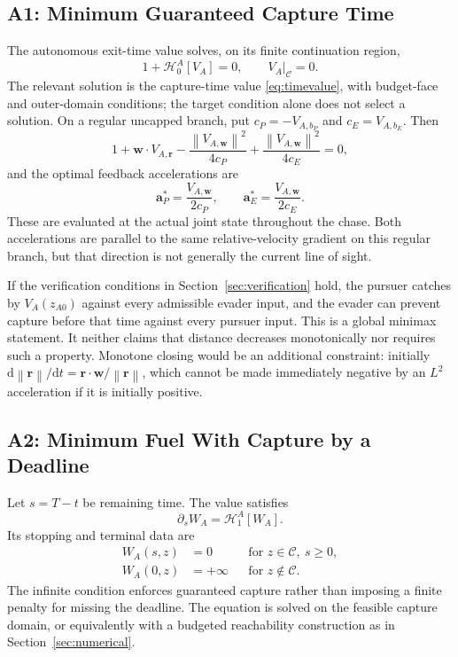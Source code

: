\documentclass[journal,a4paper]{IEEEtran}
\newcommand{\C}{\mathcal C}
\newcommand{\HH}{\mathcal H}
\newcommand{\norm}[1]{\left\|#1\right\|}
\newcommand{\dd}{\mathrm d}
\begin{document}
\subsection{A1: Minimum Guaranteed Capture Time}
The autonomous exit-time value solves, on its finite continuation region,
\begin{equation}
 \boxed{1+\HH^A_0[V_A]=0,\qquad V_A|_{\C}=0.}
 \label{eq:A1}
\end{equation}
The relevant solution is the capture-time value \eqref{eq:timevalue}, with budget-face and outer-domain conditions; the target condition alone does not select a solution. On a regular uncapped branch, put $c_P=-V_{A,b_P}$ and $c_E=V_{A,b_E}$. Then
\begin{equation}
 1+\mathbf w\cdot V_{A,\mathbf r}
 -\frac{\norm{V_{A,\mathbf w}}^2}{4c_P}
 +\frac{\norm{V_{A,\mathbf w}}^2}{4c_E}=0,
 \label{eq:A1expanded}
\end{equation}
and the optimal feedback accelerations are
\begin{equation}
 \boxed{\mathbf a_P^*=\frac{V_{A,\mathbf w}}{2c_P},\qquad
        \mathbf a_E^*=\frac{V_{A,\mathbf w}}{2c_E}.}
 \label{eq:A1feedback}
\end{equation}
These are evaluated at the actual joint state throughout the chase. Both accelerations are parallel to the same relative-velocity gradient on this regular branch, but that direction is not generally the current line of sight.

If the verification conditions in Section~\ref{sec:verification} hold, the pursuer catches by $V_A(z_{A0})$ against every admissible evader input, and the evader can prevent capture before that time against every pursuer input. This is a global minimax statement. It neither claims that distance decreases monotonically nor requires such a property. Monotone closing would be an additional constraint: initially $\dd\norm{\mathbf r}/\dd t=\mathbf r\cdot\mathbf w/\norm{\mathbf r}$, which cannot be made immediately negative by an $L^2$ acceleration if it is initially positive.

\subsection{A2: Minimum Fuel With Capture by a Deadline}
Let $s=T-t$ be remaining time. The value satisfies
\begin{equation}
 \boxed{\partial_s W_A=\HH^A_1[W_A].}
 \label{eq:A2}
\end{equation}
Its stopping and terminal data are
\begin{align}
 W_A(s,z)&=0&&\text{for }z\in\C,\ s\ge0,\label{eq:Wbc}\\
 W_A(0,z)&=+\infty&&\text{for }z\notin\C.\nonumber
\end{align}
The infinite condition enforces guaranteed capture rather than imposing a finite penalty for missing the deadline. The equation is solved on the feasible capture domain, or equivalently with a budgeted reachability construction as in Section~\ref{sec:numerical}.
\end{document}
